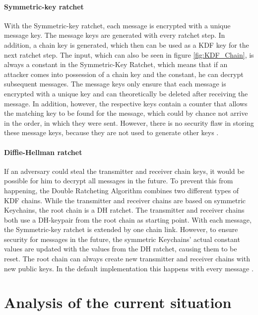 \documentclass[12pt,oneside,a4paper,parskip]{scrbook}
\begin{document}
\subsubsection{Symmetric-key ratchet}
With the Symmetric-key ratchet, each message is encrypted with a unique message key. The message keys are generated with every ratchet step. In addition, a chain key is generated, which then can be used as a KDF key for the next ratchet step. The input, which can also be seen in figure \ref{fig:KDF_Chain}, is always a constant in the Symmetric-Key Ratchet, which means that if an attacker comes into possession of a chain key and the constant, he can decrypt subsequent messages. The message keys only ensure that each message is encrypted with a unique key and can theoretically be deleted after receiving the message. In addition, however, the respective keys contain a counter that allows the matching key to be found for the message, which could by chance not arrive in the order, in which they were sent. However, there is no security flaw in storing these message keys, because they are not used to generate other keys \parencite{perrin_double_2016}.


\subsubsection{Diffie-Hellman ratchet}
If an adversary could steal the transmitter and receiver chain keys, it would be possible for him to decrypt all messages in the future. To prevent this from happening, the Double Ratcheting Algorithm combines two different types of KDF chains. While the transmitter and receiver chains are based on symmetric Keychains, the root chain is a DH ratchet. The transmitter and receiver chains both use a DH-keypair from the root chain as starting point. With each message, the Symmetric-key ratchet is extended by one chain link. However, to ensure security for messages in the future, the symmetric Keychains' actual constant values are updated with the values from the DH ratchet, causing them to be reset. The root chain can always create new transmitter and receiver chains with new public keys. In the default implementation this happens with every message \parencite{perrin_double_2016}.


\chapter{Analysis of the current situation}
\end{document}
